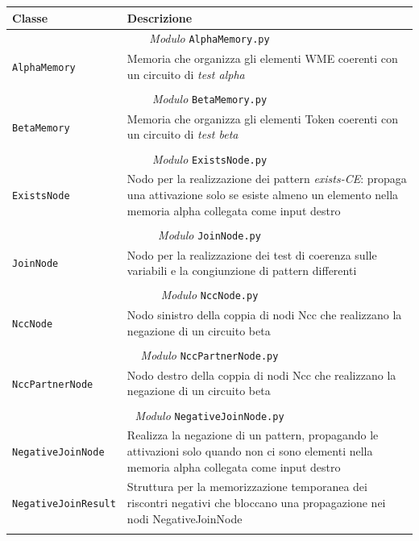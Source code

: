 \begin{longtable}{p{5.5cm}p{6.5cm}}
\hline 
\textbf{Classe} & \textbf{Descrizione} \\ 
\hline\hline 
\endhead

\multicolumn{2}{c}{\emph{Modulo} \texttt{AlphaMemory.py}}\\
	\hdashline[5pt/5pt]
		\texttt{AlphaMemory} & Memoria che organizza gli elementi WME coerenti con un circuito di \emph{test alpha} \\ 
	\hline\\

\multicolumn{2}{c}{\emph{Modulo} \texttt{BetaMemory.py}}\\
	\hdashline[5pt/5pt]
		\texttt{BetaMemory} & Memoria che organizza gli elementi Token coerenti con un circuito di \emph{test beta} \\ 
	\hline\\

\multicolumn{2}{c}{\emph{Modulo} \texttt{ExistsNode.py}}\\
	\hdashline[5pt/5pt]
		\texttt{ExistsNode} & Nodo per la realizzazione dei pattern \emph{exists-CE}: propaga una attivazione solo se esiste almeno un elemento nella memoria alpha collegata come input destro \\ 
	\hline\\

\multicolumn{2}{c}{\emph{Modulo} \texttt{JoinNode.py}}\\
	\hdashline[5pt/5pt]
		\texttt{JoinNode} & Nodo per la realizzazione dei test di coerenza sulle variabili e la congiunzione di pattern differenti \\ 
	\hline\\

\multicolumn{2}{c}{\emph{Modulo} \texttt{NccNode.py}}\\
	\hdashline[5pt/5pt]
		\texttt{NccNode} & Nodo sinistro della coppia di nodi Ncc che realizzano la negazione di un circuito beta \\ 
	\hline\\

\multicolumn{2}{c}{\emph{Modulo} \texttt{NccPartnerNode.py}}\\
	\hdashline[5pt/5pt]
		\texttt{NccPartnerNode} & Nodo destro della coppia di nodi Ncc che realizzano la negazione di un circuito beta \\ 
	\hline\\


\multicolumn{2}{c}{\emph{Modulo} \texttt{NegativeJoinNode.py}}\\
	\hdashline[5pt/5pt]
		\texttt{NegativeJoinNode} & Realizza la negazione di un pattern, propagando le attivazioni solo quando non ci sono elementi nella memoria alpha collegata come input destro\\ 
	\hdashline[1pt/5pt]
		\texttt{NegativeJoinResult} & Struttura per la memorizzazione temporanea dei riscontri negativi che bloccano una propagazione nei nodi NegativeJoinNode\\ 
	\hline\\


\end{longtable}
